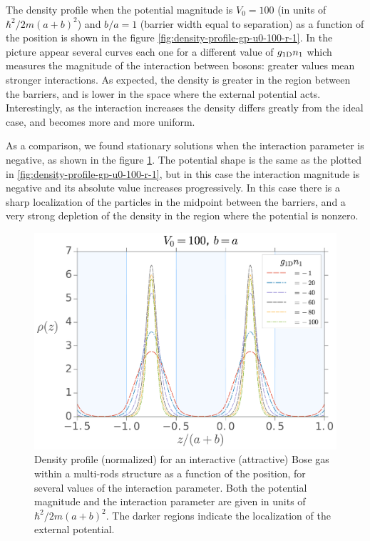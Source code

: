 The density profile when the potential magnitude is $V_0 = 100$ (in units of
$\hbar^2 / 2m(a+b)^2$) and $b/a = 1$ (barrier width equal to separation) as a
function of the position is shown in the figure
\ref{fig:density-profile-gp-u0-100-r-1}. In the picture appear several curves
each one for a different value of $g_{ \mathrm{1D} } n_1$ which measures the magnitude of
the interaction between bosons: greater values mean stronger interactions. As
expected, the density is greater in the region between the barriers, and is
lower in the space where the external potential acts. Interestingly, as the
interaction increases the density differs greatly from the ideal case, and
becomes more and more uniform.

As a comparison, we found stationary solutions when the interaction parameter is
negative, as shown in the figure \ref{fig:density-profile-gp-u0-100-r-1-attr}.
The potential shape is the same as the plotted in
\ref{fig:density-profile-gp-u0-100-r-1}, but in this case the interaction
magnitude is negative and its absolute value increases progressively. In this
case there is a sharp localization of the particles in the midpoint between the
barriers, and a very strong depletion of the density in the region where the
potential is nonzero.
%
\begin{figure}[h!]
  \centering
  \includegraphics[width=0.75\linewidth]{./figures/density_profile_gp_u0-100_r-1_attr}
  \caption{Density profile (normalized) for an interactive (attractive) Bose gas
    within a multi-rods structure as a function of the position, for several
    values of the interaction parameter. Both the potential magnitude and the
    interaction parameter are given in units of $\hbar^2 / 2 m (a+b)^2$. The
    darker regions indicate the localization of the external potential.}
  \label{fig:density-profile-gp-u0-100-r-1-attr}
\end{figure}
%


